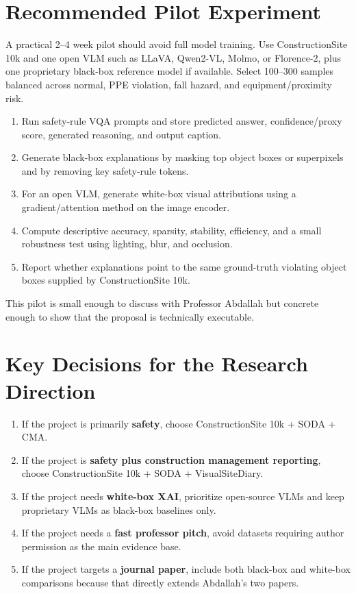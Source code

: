 \documentclass[10pt]{article}
\begin{document}
\section{Recommended Pilot Experiment}
A practical 2--4 week pilot should avoid full model training. Use ConstructionSite 10k and one open VLM such as LLaVA, Qwen2-VL, Molmo, or Florence-2, plus one proprietary black-box reference model if available. Select 100--300 samples balanced across normal, PPE violation, fall hazard, and equipment/proximity risk.

\begin{enumerate}
  \item Run safety-rule VQA prompts and store predicted answer, confidence/proxy score, generated reasoning, and output caption.
  \item Generate black-box explanations by masking top object boxes or superpixels and by removing key safety-rule tokens.
  \item For an open VLM, generate white-box visual attributions using a gradient/attention method on the image encoder.
  \item Compute descriptive accuracy, sparsity, stability, efficiency, and a small robustness test using lighting, blur, and occlusion.
  \item Report whether explanations point to the same ground-truth violating object boxes supplied by ConstructionSite 10k.
\end{enumerate}

This pilot is small enough to discuss with Professor Abdallah but concrete enough to show that the proposal is technically executable.

\section{Key Decisions for the Research Direction}
\begin{enumerate}
  \item If the project is primarily \textbf{safety}, choose ConstructionSite 10k + SODA + CMA.
  \item If the project is \textbf{safety plus construction management reporting}, choose ConstructionSite 10k + SODA + VisualSiteDiary.
  \item If the project needs \textbf{white-box XAI}, prioritize open-source VLMs and keep proprietary VLMs as black-box baselines only.
  \item If the project needs a \textbf{fast professor pitch}, avoid datasets requiring author permission as the main evidence base.
  \item If the project targets a \textbf{journal paper}, include both black-box and white-box comparisons because that directly extends Abdallah's two papers.
\end{enumerate}
\end{document}
